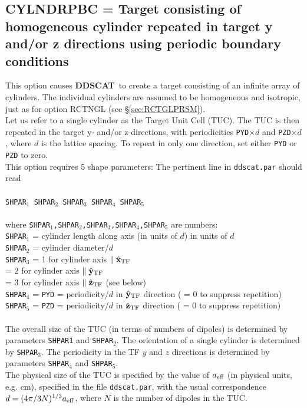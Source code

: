 \subsection{ CYLNDRPBC = Target consisting of homogeneous cylinder
                     repeated in
                     target y and/or z directions using
                     periodic boundary conditions}
            \label{sec:CYLNDRPBC}
            This option causes {{\bf DDSCAT}}\ to create a target consisting
	    of an infinite array of cylinders.
	    The individual cylinders 
	    are assumed to be homogeneous and isotropic,
	    just as for option RCTNGL (see \S\ref{sec:RCTGLPRSM}).
	    \ \\
	    Let us 
	    refer to a single cylinder as the Target Unit Cell (TUC).
	    The TUC 
	    is then repeated in the target y- and/or z-directions, with 
	    periodicities {\tt PYD}$\times d$ and 
	    {\tt PZD}$\times d$, where $d$ is the lattice spacing.
	    To repeat in only one direction, set either {\tt PYD} or
	    {\tt PZD} to zero.\\
	    This option requires 5 shape parameters:
	    The pertinent line in {\tt ddscat.par} should read\\
	    \ \\
	{\tt SHPAR$_1$ SHPAR$_2$ SHPAR$_3$ SHPAR$_4$ SHPAR}$_5$\\
	    \ \\
	where {\tt SHPAR$_1$,SHPAR$_2$,SHPAR$_3$,SHPAR$_4$,SHPAR$_5$} are 
        numbers:\\
	{\tt SHPAR}$_1$ = cylinder length along axis (in units of $d$)
	in units of $d$\\
	{\tt SHPAR$_2$} = cylinder diameter/$d$\\
	{\tt SHPAR}$_3$ = 1 for cylinder axis $\parallel \hat{\bf x}_{\rm TF}$\\
        = 2 for cylinder axis $\parallel \hat{\bf y}_{\rm TF}$\\
        = 3 for cylinder axis $\parallel \hat{\bf z}_{\rm TF}$
	                 (see below)\\
	{\tt SHPAR}$_4$ = {\tt PYD} = periodicity/$d$ in $\hat{\bf y}_{\rm TF}$ direction 
        ( = 0 to suppress repetition)\\
	{\tt SHPAR}$_5$ = {\tt PZD} = periodicity/$d$ in $\hat{\bf z}_{\rm TF}$ direction 
        ( = 0 to suppress repetition)\\
	\ \\
	The overall size of the TUC (in terms of numbers of
	dipoles) is determined by parameters 
	{\tt SHPAR1} and {\tt SHPAR$_2$}.
	The orientation of a single cylinder is determined by {\tt SHPAR}$_3$.
	The periodicity in the TF $y$ and $z$ directions is determined
	by parameters {\tt SHPAR}$_4$ and {\tt SHPAR}$_5$.\\
	The physical size of the TUC is specified by the value of
	${a}_{\rm eff}$ (in physical units, e.g. cm), 
	specified in the file {\tt ddscat.par}, with the usual
	correspondence $d=(4\pi/3N)^{1/3}{a}_{\rm eff}$, where $N$ is the number
	of dipoles in the TUC.

